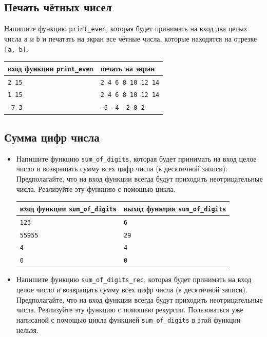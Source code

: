 \documentclass[10pt]{article}
\begin{document}
\subsection{Печать чётных чисел}
Напишите функцию \texttt{print\_even}, которая будет принимать на вход два целых числа \texttt{a} и \texttt{b} и печатать на экран все чётные числа, которые находятся на отрезке \texttt{[a, b]}.

\begin{center}
\begin{tabular}{ l | l }
 вход функции \texttt{print\_even} & печать на экран \\ \hline
 \texttt{2 15} & \texttt{2 4 6 8 10 12 14}  \\
 \texttt{1 15} & \texttt{2 4 6 8 10 12 14}  \\  
 \texttt{-7 3} & \texttt{-6 -4 -2 0 2}  \\
\end{tabular}
\end{center}

\subsection{Сумма цифр числа}
\begin{itemize}
\item Напишите функцию \texttt{sum\_of\_digits}, которая будет принимать на вход целое число и возвращать сумму всех цифр числа (в десятичной записи). Предполагайте, что на вход функции всегда будут приходить неотрицательные числа. Реализуйте эту функцию с помощью цикла.

\begin{center}
\begin{tabular}{ l | l }
 вход функции \texttt{sum\_of\_digits} & выход функции \texttt{sum\_of\_digits} \\ \hline
 \texttt{123} & \texttt{6}  \\
 \texttt{55955} & \texttt{29}  \\  
 \texttt{4} & \texttt{4}  \\
 \texttt{0} & \texttt{0}  \\
\end{tabular}
\end{center}

\item Напишите функцию \texttt{sum\_of\_digits\_rec}, которая будет принимать на вход целое число и возвращать сумму всех цифр числа (в десятичной записи). Предполагайте, что на вход функции всегда будут приходить неотрицательные числа. Реализуйте эту функцию с помощью рекурсии. Пользоваться уже написаной с помощью цикла функцией \texttt{sum\_of\_digits} в этой функции нельзя.
 \end{itemize}
 
\end{document}
